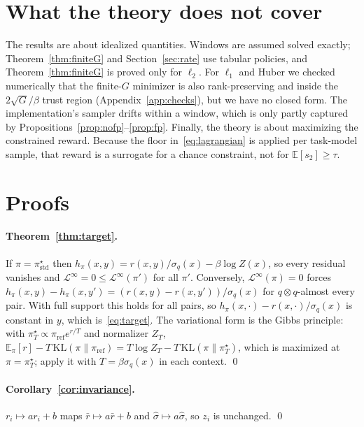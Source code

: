 \documentclass[11pt]{article}
\theoremstyle{definition}
\theoremstyle{remark}
\newcommand{\E}{\mathbb{E}}
\newcommand{\KL}{\mathrm{KL}}
\newcommand{\pref}{\pi_{\mathrm{ref}}}
\newcommand{\cL}{\mathcal{L}}
\newcommand{\1}{\mathbb{1}}
\begin{document}
\section{What the theory does not cover}\label{sec:limits}
The results are about idealized quantities. Windows are assumed solved exactly;
Theorem~\ref{thm:finiteG} and Section~\ref{sec:rate} use tabular policies, and
Theorem~\ref{thm:finiteG} is proved only for $\ell_2$. For $\ell_1$ and Huber we
checked numerically that the finite-$G$ minimizer is also rank-preserving and
inside the $2\sqrt G/\beta$ trust region (Appendix~\ref{app:checks}), but we have no
closed form. The implementation's sampler drifts within a window, which is only
partly captured by Propositions~\ref{prop:nofp}--\ref{prop:fp}. Finally, the theory
is about maximizing the constrained reward. Because the floor in~\eqref{eq:lagrangian}
is applied per task-model sample, that reward is a surrogate for a chance
constraint, not for $\E[s_2]\ge\tau$.

\appendix
\section{Proofs}\label{app:proofs}

\paragraph{Theorem~\ref{thm:target}.} If $\pi=\pi^\star_{\mathrm{std}}$ then
$h_\pi(x,y)=r(x,y)/\sigma_q(x)-\beta\log Z(x)$, so every residual vanishes and
$\cL^\infty=0\le\cL^\infty(\pi')$ for all $\pi'$. Conversely, $\cL^\infty(\pi)=0$ forces
$h_\pi(x,y)-h_\pi(x,y')=(r(x,y)-r(x,y'))/\sigma_q(x)$ for $q\otimes q$-almost every pair.
With full support this holds for all pairs, so $h_\pi(x,\cdot)-r(x,\cdot)/\sigma_q(x)$ is
constant in $y$, which is~\eqref{eq:target}. The variational form is the Gibbs
principle: with $\pi^\star_T\propto\pref e^{r/T}$ and normalizer $Z_T$,
$\E_\pi[r]-T\,\KL(\pi\|\pref)=T\log Z_T-T\,\KL(\pi\|\pi^\star_T)$, which is maximized at
$\pi=\pi^\star_T$; apply it with $T=\beta\sigma_q(x)$ in each context. \qed

\paragraph{Corollary~\ref{cor:invariance}.} $r_i\mapsto a r_i+b$ maps $\bar r\mapsto
a\bar r+b$ and $\hat\sigma\mapsto a\hat\sigma$, so $z_i$ is unchanged. \qed
\end{document}
